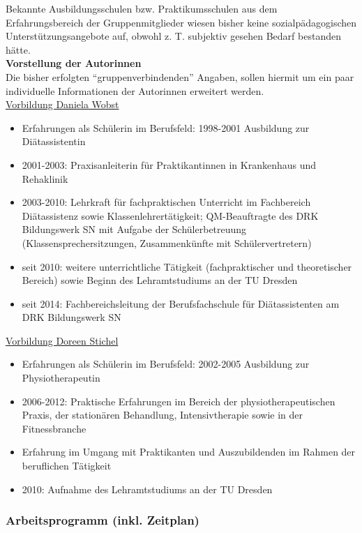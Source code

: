 Bekannte Ausbildungsschulen bzw. Praktikumsschulen aus dem Erfahrungsbereich der Gruppenmitglieder wiesen bisher keine sozialpädagogischen Unterstützungsangebote auf, obwohl z. T. subjektiv gesehen Bedarf bestanden hätte.\\

\noindent
\textbf{Vorstellung der Autorinnen}\\

Die bisher erfolgten "`gruppenverbindenden"' Angaben, sollen hiermit um ein paar individuelle Informationen der Autorinnen erweitert werden.\\

\noindent
\underline{Vorbildung Daniela Wobst}
\begin{itemize}
	\item Erfahrungen als Schülerin im Berufsfeld: 1998-2001 Ausbildung zur Diätassistentin
	\item 2001-2003: Praxisanleiterin für Praktikantinnen in Krankenhaus und Rehaklinik
	\item 2003-2010: Lehrkraft für fachpraktischen Unterricht im Fachbereich Diätassistenz sowie Klassenlehrertätigkeit; QM-Beauftragte des DRK Bildungswerk SN mit Aufgabe der Schülerbetreuung (Klassensprechersitzungen, Zusammenkünfte mit Schülervertretern)
	\item seit 2010: weitere unterrichtliche Tätigkeit (fachpraktischer und theoretischer Bereich) sowie Beginn des Lehramtstudiums an der TU Dresden
	\item seit 2014: Fachbereichsleitung der Berufsfachschule für Diätassistenten am DRK Bildungswerk SN
\end{itemize}

\noindent
\underline{Vorbildung Doreen Stichel}
\begin{itemize}
	\item Erfahrungen als Schülerin im Berufsfeld: 2002-2005 Ausbildung zur Physiotherapeutin
	\item 2006-2012: Praktische Erfahrungen im Bereich der physiotherapeutischen Praxis, der stationären Behandlung, Intensivtherapie sowie in der Fitnessbranche
	\item Erfahrung im Umgang mit Praktikanten und Auszubildenden im Rahmen der beruflichen Tätigkeit
	\item 2010: Aufnahme des Lehramtstudiums an der TU Dresden
\end{itemize}

\newpage
\subsubsection{Arbeitsprogramm (inkl. Zeitplan)}
\label{sec:ArbeitsprogrammInklZeitplan}


